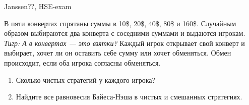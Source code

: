 \begin{problem}
\begin{source}
Janssen??, HSE-exam
\end{source}
В пяти конвертах спрятаны суммы в 10\$, 20\$, 40\$, 80\$ и 160\$. Случайным образом выбираются два конверта с соседними суммами и выдаются игрокам. {\it Тигр: А в конвертах --- это взятки?} Каждый игрок открывает свой конверт и выбирает, хочет ли он оставить себе сумму или хочет обменяться. Обмен происходит, если оба игрока согласны обменяться.\par
\begin{enumerate}
\item	Сколько чистых стратегий у каждого игрока?\par
\item Найдите все равновесия Байеса-Нэша в чистых и смешанных стратегиях.
\end{enumerate}


\begin{sol}

\end{sol}
\end{problem}


